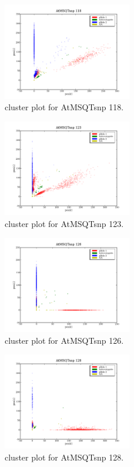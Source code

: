 \begin{figure}[H]
\includegraphics[width=0.5\textwidth]{figures/cluster_plot_AtMSQTsnp_118.png}
\caption{cluster plot for AtMSQTsnp 118.} \label{flAtMSQTsnp118}
\end{figure}
\begin{figure}[H]
\includegraphics[width=0.5\textwidth]{figures/cluster_plot_AtMSQTsnp_123.png}
\caption{cluster plot for AtMSQTsnp 123.} \label{flAtMSQTsnp123}
\end{figure}
\begin{figure}[H]
\includegraphics[width=0.5\textwidth]{figures/cluster_plot_AtMSQTsnp_126.png}
\caption{cluster plot for AtMSQTsnp 126.} \label{flAtMSQTsnp126}
\end{figure}
\begin{figure}[H]
\includegraphics[width=0.5\textwidth]{figures/cluster_plot_AtMSQTsnp_128.png}
\caption{cluster plot for AtMSQTsnp 128.} \label{flAtMSQTsnp128}
\end{figure}
